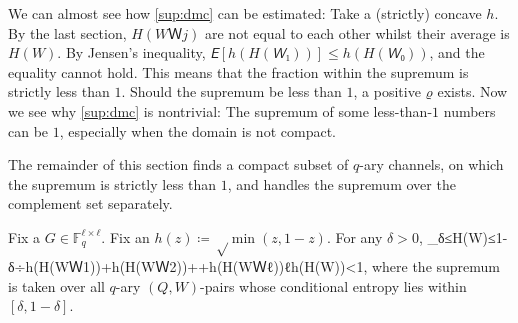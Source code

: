 \documentclass[openany]{amsbook}
\numberwithin{equation}{chapter}
\numberwithin{figure}{chapter}
\numberwithin{table}{chapter}
\def\[#1\]{\begin{equation*}{#1}\end{equation*}}
\theoremstyle{definition}	理dfn:Definition~?s			理exa:Example~?s
\theoremstyle{remark}		理cla:Claim~?s				理rem:Remark~?s
\begin{document}
	We can almost see how \cref{sup:dmc} can be estimated:
	Take a (strictly) concave $h$.
	By the last section,
	$H(WＷj)$ are not equal to each other whilst their average is $H(W)$.
	By Jensen's inequality, $𝘌[h(H(𝘞₁))]≤h(H(𝘞₀))$, and the equality cannot hold.
	This means that the fraction within the supremum is strictly less than $1$.
	Should the supremum be less than $1$, a positive $ϱ$ exists.
	Now we see why \cref{sup:dmc} is nontrivial:
	The supremum of some less-than-$1$ numbers can be $1$,
	especially when the domain is not compact.
	
	The remainder of this section finds a compact subset of $q$-ary channels,
	on which the supremum is strictly less than $1$,
	and handles the supremum over the complement set separately.
	
	\begin{lem}\label{lem:eigen-H}
		Fix a $G∈𝔽_q^{ℓ×ℓ}$.
		Fix an $h(z)≔√{\min(z,1-z)}$.
		For any $δ>0$,
		\[\sup_{δ≤H(W)≤1-δ}÷{h(H(WＷ1))+h(H(WＷ2))+\dotsb+h(H(WＷ{ℓ}))}{ℓh(H(W))}<1,
			\label{sup:mediocre}\]
		where the supremum is taken over all $q$-ary $(Q,W)$-pairs
		whose conditional entropy lies within $[δ,1-δ]$.
	\end{lem}
	
\end{document}
